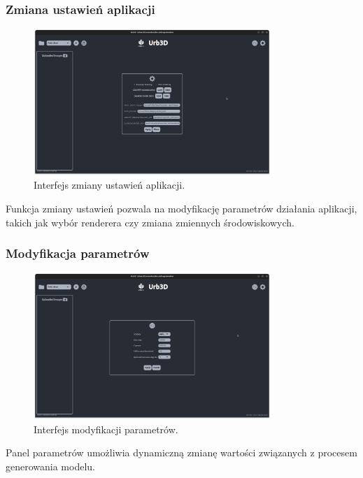 \subsubsection{Zmiana ustawień aplikacji}
\begin{figure}[h!]
    \centering
    \includegraphics[width=0.8\textwidth]{img/wizualizacja/ui_ustawienia.png}
    \caption{Interfejs zmiany ustawień aplikacji.}
\end{figure}

Funkcja zmiany ustawień pozwala na modyfikację parametrów działania aplikacji, takich jak wybór renderera czy zmiana zmiennych środowiskowych.

\clearpage

\subsubsection{Modyfikacja parametrów}
\begin{figure}[h!]
    \centering
    \includegraphics[width=0.8\textwidth]{img/wizualizacja/ui_parametry.png}
    \caption{Interfejs modyfikacji parametrów.}
\end{figure}

Panel parametrów umożliwia dynamiczną zmianę wartości związanych z procesem generowania modelu.

